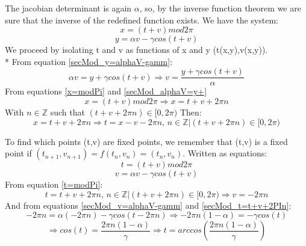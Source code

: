 \documentclass[a4paper]{article}
\begin{document}
The jacobian determinant is again $\alpha$, so,
by the inverse function theorem we are sure that the inverse of the redefined function exists.
We have the system:
\begin{equation}\label{x=modPi}
x=(t+v)mod2\pi
\end{equation}
\begin{equation}\label{secMod_y=alphaV-gamm}
y=\alpha v -\gamma cos(t+v)
\end{equation}
We proceed by isolating t and v as functions of x and y (t(x,y),v(x,y)).
\\*
From equation \ref{secMod_y=alphaV-gamm}:
\begin{equation}\label{secMod_alphaV=y+}
\alpha v=y +\gamma cos(t+v)\Rightarrow v=\frac{y +\gamma cos(t+v)}{\alpha}
\end{equation}
From equations \ref{x=modPi} and \ref{secMod_alphaV=y+}
\begin{equation}
x=(t+v)mod2\pi \Rightarrow x=t+v+2\pi n
\end{equation}
With $n \in \mathbb{Z}$ such that $(t+v+2\pi n) \in [0,2\pi)$
Then:
\begin{equation}
x=t+v+2\pi n \Rightarrow t=x-v-2\pi n ,\,n \in \mathbb{Z}|(t+v+2\pi n) \in [0,2\pi)
\end{equation}

To find which points (t,v) are fixed points,
we remember that (t,v) is a fixed point if $(t_{n+1},v_{n+1})=f(t_n,v_n)=(t_n,v_n)$.
Written as equations: 
\begin{equation}\label{t=modPi}
t=(t+v)mod2\pi
\end{equation}
\begin{equation}\label{secMod_v=alphaV-gamm}
v=\alpha v -\gamma cos(t+v)
\end{equation}
From equation \ref{t=modPi}:
\begin{equation}\label{secMod_t=t+v+2PIn}
t=t+v+2\pi n ,\,n \in \mathbb{Z}|(t+v+2\pi n) \in [0,2\pi) \Rightarrow v=-2\pi n
\end{equation}
And from equations \ref{secMod_v=alphaV-gamm} and \ref{secMod_t=t+v+2PIn}:
$$
-2\pi n=\alpha (-2\pi n) -\gamma cos(t-2\pi n)\Rightarrow -2\pi n(1-\alpha)=-\gamma cos(t)$$
\begin{equation}
\Rightarrow cos(t)=\frac{2\pi n(1-\alpha)}{\gamma}\Rightarrow t=arccos(\frac{2\pi n(1-\alpha)}{\gamma})
\end{equation}




\newpage
\end{document}
